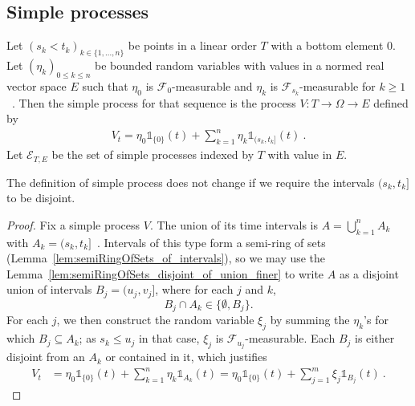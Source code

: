 \subsection{Simple processes}

\begin{definition}\label{def:simpleProcess}
  \leanok
Let $(s_k < t_k)_{k \in \{1, ..., n\}}$ be points in a linear order $T$ with a bottom element 0.
Let $(\eta_k)_{0 \le k \le n}$ be bounded random variables with values in a normed real vector space $E$ such that $\eta_0$ is $\mathcal{F}_0$-measurable and $\eta_k$ is $\mathcal{F}_{s_k}$-measurable for $k \ge 1$~.
Then the simple process for that sequence is the process $V : T \to \Omega \to E$ defined by
\begin{align*}
  V_t = \eta_0 \mathbb{1}_{\{0\}}(t) + \sum_{k=1}^{n} \eta_k \mathbb{1}_{(s_k, t_k]}(t)
  \: .
\end{align*}
Let $\mathcal{E}_{T, E}$ be the set of simple processes indexed by $T$ with value in $E$.
\end{definition}

\begin{lemma}\label{lem:simpleProcess_admitsDisjointIntervals}
  The definition of simple process does not change if we require the intervals $(s_k, t_k]$ to be disjoint.
\end{lemma}

\begin{proof}
  Fix a simple process $V$.
  The union of its time intervals is $A=\bigcup_{k=1}^n A_k$ with $A_k = (s_k, t_k]$~.
  Intervals of this type form a semi-ring of sets
  (Lemma~\ref{lem:semiRingOfSets_of_intervals}),
  so we may use the Lemma~\ref{lem:semiRingOfSets_disjoint_of_union_finer}
  to write $A$ as a disjoint union of intervals $B_j=(u_j, v_j]$,
  where for each $j$ and $k$,
  \[
  B_j \cap A_k \in \{\emptyset, B_j\}.
    \]
  For each $j$, we then construct the random variable $\xi_j$
  by summing the $\eta_k$'s for which $B_j \subseteq A_k$;
  as $s_k\le u_j$ in that case, $\xi_j$ is $\mathcal{F}_{u_j}$-measurable.
  Each $B_j$ is either disjoint from an $A_k$ or contained in it, which justifies
  \begin{align*}
    V_t
    &= \eta_0 \mathbb{1}_{\{0\}}(t) + \sum_{k=1}^{n} \eta_k \mathbb{1}_{A_k}(t)
    = \eta_0 \mathbb{1}_{\{0\}}(t) + \sum_{j=1}^{m} \xi_j \mathbb{1}_{B_j}(t)
    \: .
  \end{align*}
\end{proof}

